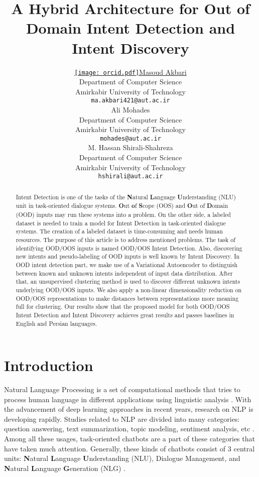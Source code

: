 \documentclass{article}
\title{A Hybrid Architecture for Out of Domain Intent Detection and Intent Discovery}
\date{}
\author{ \href{https://orcid.org/0000-0002-7691-0778}{\texttt{[image: orcid.pdf]}\hspace{1mm}Masoud Akbari} \\
	Department of Computer Science\\
	Amirkabir University of Technology\\
	\texttt{ma.akbari421@aut.ac.ir} \\
\And
	{Ali Mohades} \\
	Department of Computer Science\\
	Amirkabir University of Technology\\
	\texttt{mohades@aut.ac.ir} \\
	\And
	{M. Hassan Shirali-Shahreza} \\
	Department of Computer Science\\
	Amirkabir University of Technology\\
	\texttt{hshirali@aut.ac.ir} \\
}
\begin{document}
\maketitle

\begin{abstract}
	Intent Detection is one of the tasks of the \textbf{N}atural \textbf{L}anguage \textbf{U}nderstanding (NLU) unit in task-oriented dialogue systems.
  \textbf{O}ut \textbf{o}f \textbf{S}cope (OOS) and \textbf{O}ut of \textbf{D}omain (OOD) inputs may run these systems into a problem.
  On the other side, a labeled dataset is needed to train a model for Intent Detection in task-oriented dialogue systems. 
  The creation of a labeled dataset is time-consuming and needs human resources. 
  The purpose of this article is to address mentioned problems. 
  The task of identifying OOD/OOS inputs is named OOD/OOS Intent Detection. 
  Also, discovering new intents and pseudo-labeling of OOD inputs is well known by Intent Discovery. 
  In OOD intent detection part, we make use of a Variational Autoencoder to distinguish between known and unknown intents independent of input data distribution. 
  After that, an unsupervised clustering method is used to discover different unknown intents underlying OOD/OOS inputs. 
  We also apply a non-linear dimensionality reduction on OOD/OOS representations to make distances between representations more meaning full for clustering. 
  Our results show that the proposed model for both OOD/OOS Intent Detection and Intent Discovery achieves great results and passes baselines in English and Persian languages.
\end{abstract}




\section{Introduction}
Natural Language Processing is a set of computational methods
that tries to process human language in different applications using
linguistic analysis \citep{liddy2001natural}. With the advancement of deep learning
approaches in recent years, research on NLP is developing rapidly.
Studies related to NLP are divided into many categories: question answering, text summarization,
topic modeling, sentiment analysis, etc \citep{eisenstein2019introduction}.
Among all these usages, task-oriented chatbots are a part of these categories that have taken much attention.
Generally, these kinds of chatbots consist of 3 central units:
\textbf{N}atural \textbf{L}anguage \textbf{U}nderstanding (NLU), Dialogue Management, and \textbf{N}atural \textbf{L}anguage \textbf{G}eneration (NLG) \citep{galitsky2019chatbot}. 
\end{document}
